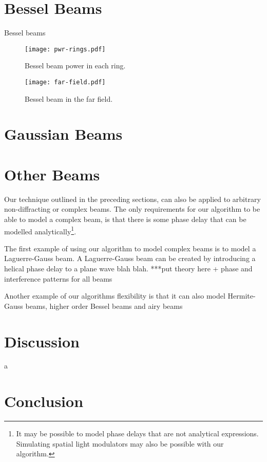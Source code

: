 \section{Bessel Beams}

Bessel beams

\begin{figure}
\centering
\texttt{[image: pwr-rings.pdf]}
\caption{Bessel beam power in each ring.}
\label{fig:pwrring}
\end{figure}

\begin{figure}
\centering
\texttt{[image: far-field.pdf]}
\caption{Bessel beam in the far field.}
\label{fig:farfield}
\end{figure}
\section{Gaussian Beams}



\section{Other Beams}

Our technique outlined in the preceding sections, can also be applied to arbitrary non-diffracting or complex beams. The only requirements for our algorithm to be able to model a complex beam, is that there is some phase delay that can be modelled analytically\footnote{It may be possible to model phase delays that are not analytical expressions. Simulating spatial light modulators may also be possible with our algorithm.}.

The first example of using our algorithm to model complex beams is to model a Laguerre-Gauss beam. A Laguerre-Gauss beam can be created by introducing a helical phase delay to a plane wave blah blah. ***put theory here + phase and interference patterns for all beams

Another example of our algorithms flexibility is that it can also model Hermite-Gauss beams, higher order Bessel beams and airy beams

\section{Discussion}



a~\cite{mignon2016fractional}
\section{Conclusion}